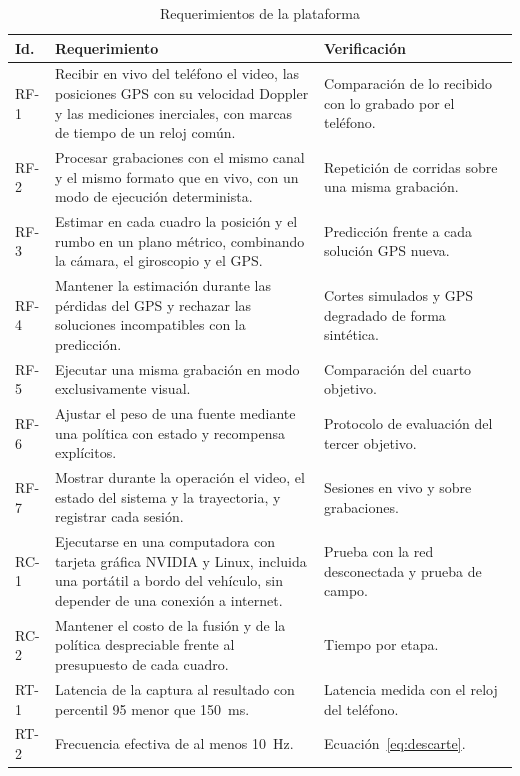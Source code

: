 \begin{table}[H]
\centering
\caption{Requerimientos de la plataforma}
\label{tab:res-requerimientos}
\footnotesize
\begin{tabularx}{\textwidth}{@{}>{\raggedright\arraybackslash}p{1.1cm}>{\raggedright\arraybackslash}X>{\raggedright\arraybackslash}p{4.6cm}@{}}
\toprule
\textbf{Id.} & \textbf{Requerimiento} & \textbf{Verificación} \\
\midrule
RF-1 & Recibir en vivo del teléfono el video, las posiciones GPS con su velocidad Doppler y las mediciones inerciales, con marcas de tiempo de un reloj común. & Comparación de lo recibido con lo grabado por el teléfono. \\
RF-2 & Procesar grabaciones con el mismo canal y el mismo formato que en vivo, con un modo de ejecución determinista. & Repetición de corridas sobre una misma grabación. \\
RF-3 & Estimar en cada cuadro la posición y el rumbo en un plano métrico, combinando la cámara, el giroscopio y el GPS. & Predicción frente a cada solución GPS nueva. \\
RF-4 & Mantener la estimación durante las pérdidas del GPS y rechazar las soluciones incompatibles con la predicción. & Cortes simulados y GPS degradado de forma sintética. \\
RF-5 & Ejecutar una misma grabación en modo exclusivamente visual. & Comparación del cuarto objetivo. \\
RF-6 & Ajustar el peso de una fuente mediante una política con estado y recompensa explícitos. & Protocolo de evaluación del tercer objetivo. \\
RF-7 & Mostrar durante la operación el video, el estado del sistema y la trayectoria, y registrar cada sesión. & Sesiones en vivo y sobre grabaciones. \\
\addlinespace
RC-1 & Ejecutarse en una computadora con tarjeta gráfica NVIDIA y Linux, incluida una portátil a bordo del vehículo, sin depender de una conexión a internet. & Prueba con la red desconectada y prueba de campo. \\
RC-2 & Mantener el costo de la fusión y de la política despreciable frente al presupuesto de cada cuadro. & Tiempo por etapa. \\
\addlinespace
RT-1 & Latencia de la captura al resultado con percentil 95 menor que 150~ms. & Latencia medida con el reloj del teléfono. \\
RT-2 & Frecuencia efectiva de al menos 10~Hz. & Ecuación~\eqref{eq:descarte}. \\

\end{tabularx}
\end{table}
